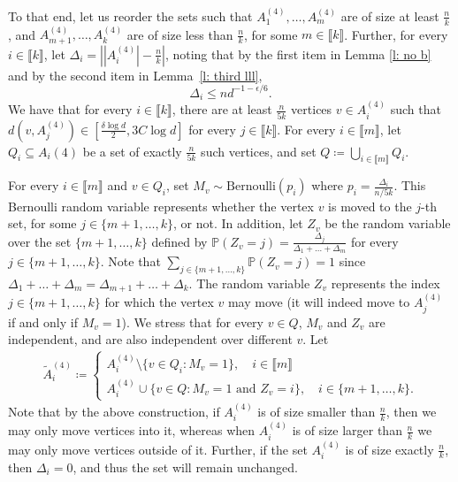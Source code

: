 \documentclass[notitlepage]{scrartcl}
\newcommand{\br}[1]{\llbracket{#1}\rrbracket}
\renewcommand{\Pr}{\mathbb{P}}
\begin{document}
To that end, let us reorder the sets such that $A_1^{(4)},\ldots, A_m^{(4)}$ are of size at least $\frac{n}{k}$, and $A_{m+1}^{(4)},\ldots,A_k^{(4)}$ are of size less than $\frac{n}{k}$, for some $m\in \br{k}$. Further, for every $i\in \br{k}$, let $\Delta_i=\left||A_i^{(4)}|-\frac{n}{k}\right|$, noting that by the first item in Lemma \ref{l: no b} and by the second item in Lemma~\ref{l: third lll}, 
\begin{equation}
\Delta_i\le nd^{-1-\epsilon/6}.
\label{eq:Delta_i_upper_bound}
\end{equation} 
We have that for every $i\in \br{k}$, there are at least $\frac{n}{5k}$ vertices $v\in A_i^{(4)}$ such that $d(v,A_j^{(4)})\in \left[\frac{\delta\log d}{2}, 3C\log d\right]$ for every $j\in \br{k}$. For every $i\in \br{m}$, let $Q_i\subseteq A_i(4)$ be a set of exactly $\frac{n}{5k}$ such vertices, and set $Q\coloneqq\bigcup_{i\in \br{m}}Q_i$. 

For every $i \in \br{m}$ and $v \in Q_i$, set $M_v \sim \text{Bernoulli}(p_i)$ where $p_i = \frac{\Delta_i}{n/5k}$. This Bernoulli random variable represents whether the vertex $v$ is moved to the $j$-th set, for some $j \in \{m+1,\ldots, k\}$, or not. In addition, let $Z_v$ be the random variable over the set $\{m+1,\ldots,k\}$ defined by $\Pr(Z_v = j) = \frac{\Delta_j}{\Delta_1 + \ldots  + \Delta_m}$ for every $j \in \{m+1,\ldots, k\}$. Note that $\sum_{j\in\{m+1,\ldots,k\}}\Pr(Z_v=j)=1$ since $\Delta_1+\ldots +  \Delta_m=\Delta_{m+1}+\ldots+\Delta_k$. The random variable $Z_v$ represents the index $j \in \{m+1,\ldots,k\}$ for which the vertex $v$ may move (it will indeed move to $A_j^{(4)}$ if and only if $M_v=1$). We stress that for every $v\in Q$, $M_v$ and $Z_v$ are independent, and are also independent over different $v$. Let
\begin{align*}
    \tilde{A}_i^{(4)} \coloneqq \begin{cases}
        A_i^{(4)} \setminus \{v \in Q_i \colon M_v = 1\}, \quad i \in \br{m} \\
        A_i^{(4)} \cup \{v \in Q \colon M_v = 1 \text{ and } Z_v = i\}, \quad i \in \{m+1,\ldots,k\}.
    \end{cases}
\end{align*}
Note that by the above construction, if $A_i^{(4)}$ is of size smaller than $\frac{n}{k}$, then we may only move vertices into it, whereas when $A_i^{(4)}$ is of size larger than $\frac{n}{k}$ we may only move vertices outside of it. Further, if the set $A_i^{(4)}$ is of size exactly $\frac{n}{k}$, then $\Delta_i=0$, and thus the set will remain unchanged.
\end{document}
